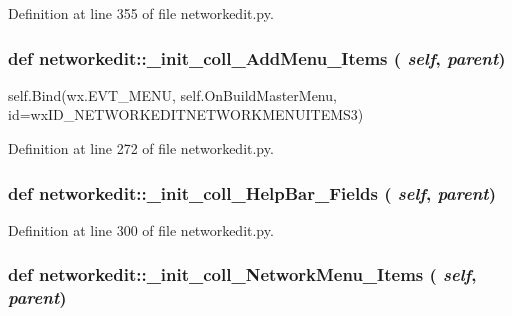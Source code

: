 Definition at line 355 of file networkedit.py.\hypertarget{namespacenetworkedit_941927e6e7615ba804042de3ece1e97f}{
\subsubsection[\_\-init\_\-coll\_\-AddMenu\_\-Items]{\setlength{\rightskip}{0pt plus 5cm}def networkedit::\_\-init\_\-coll\_\-Add\-Menu\_\-Items ( {\em self},  {\em parent})}}
\label{namespacenetworkedit_941927e6e7615ba804042de3ece1e97f}


self.Bind(wx.EVT\_\-MENU, self.On\-Build\-Master\-Menu, id=wx\-ID\_\-NETWORKEDITNETWORKMENUITEMS3) 

Definition at line 272 of file networkedit.py.\hypertarget{namespacenetworkedit_e2c968ea57457a5a0c05104c526e900d}{
\subsubsection[\_\-init\_\-coll\_\-HelpBar\_\-Fields]{\setlength{\rightskip}{0pt plus 5cm}def networkedit::\_\-init\_\-coll\_\-Help\-Bar\_\-Fields ( {\em self},  {\em parent})}}
\label{namespacenetworkedit_e2c968ea57457a5a0c05104c526e900d}




Definition at line 300 of file networkedit.py.\hypertarget{namespacenetworkedit_0f0b314087ded2fd5edee0b43ebff236}{
\subsubsection[\_\-init\_\-coll\_\-NetworkMenu\_\-Items]{\setlength{\rightskip}{0pt plus 5cm}def networkedit::\_\-init\_\-coll\_\-Network\-Menu\_\-Items ( {\em self},  {\em parent})}}
\label{namespacenetworkedit_0f0b314087ded2fd5edee0b43ebff236}




